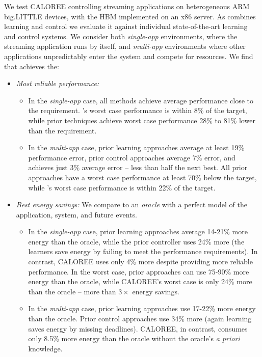 We test CALOREE controlling streaming applications on heterogeneous ARM
big.LITTLE devices, with the HBM implemented on an x86 server.  As
\SYSTEM{} combines learning and control we evaluate it against
individual state-of-the-art learning and control systems.  We consider
both \emph{single-app} environments, where the streaming application
runs by itself, and \emph{multi-app} environments where other
applications unpredictably enter the system and compete for resources.
We find that \SYSTEM{} achieves the:
\begin{itemize}
\item \textit{Most reliable performance:} 
  \begin{itemize} 
  \item In the \emph{single-app} case, all methods achieve average
    performance close to the requirement.  \SYSTEM{}'s worst case
    performance is within 8\% of the target, while prior techniques
    achieve worst case performance 28\% to 81\% lower than the
    requirement.
  \item In the \emph{multi-app} case, prior learning approaches
    average at least 19\% performance error, prior control approaches
    average 7\% error, and \SYSTEM{} achieves just 3\% average error
    -- less than half the next best.  All prior approaches have a
    worst case performance at least 70\% below the target, while
    \SYSTEM{}'s worst case performance is within 22\% of the target.
    \end{itemize}
  \item \textit{Best energy savings:} We compare to an \emph{oracle}
    with a perfect model of the application, system, and future
    events.
    \begin{itemize}
    \item In the \emph{single-app} case, prior learning approaches
      average 14-21\% more energy than the oracle, while the prior
      controller uses 24\% more (the learners save energy by failing
      to meet the performance requirements).  In contrast, CALOREE
      uses only 4\% more despite providing more reliable performance.
      In the worst case, prior approaches can use 75-90\% more energy
      than the oracle, while CALOREE's worst case is only 24\% more
      than the oracle -- more than $3\times$ energy savings.
    \item In the \emph{multi-app} case, prior learning approaches use
      17-22\% more energy than the oracle.  Prior control approaches
      use 34\% more (again learning saves energy by missing
      deadlines).  CALOREE, in contrast, consumes only 8.5\% more
      energy than the oracle without the oracle's {\em a priori}
      knowledge.
    \end{itemize}
\end{itemize}

